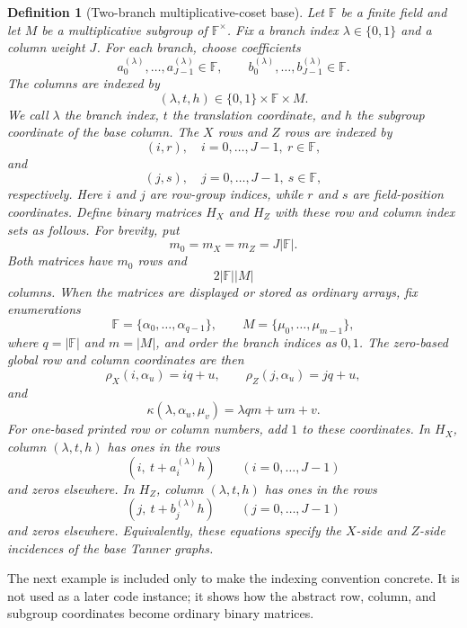 \documentclass[11pt,a4paper]{article}
\newcommand{\F}{\mathbb{F}}
\newcommand{\HX}{H_X}
\newcommand{\HZ}{H_Z}
\theoremstyle{uprighttheorem}
\newtheorem{definition}{Definition}
\begin{document}
\begin{definition}[Two-branch multiplicative-coset base]\label{def:two-branch-coset-base}
Let $\F$ be a finite field and let $M$ be a multiplicative subgroup of $\F^\times$.
Fix a branch index $\lambda\in\{0,1\}$ and a column weight $J$.
For each branch, choose coefficients
\[
  a_0^{(\lambda)},\ldots,a_{J-1}^{(\lambda)}\in\F,\qquad
  b_0^{(\lambda)},\ldots,b_{J-1}^{(\lambda)}\in\F.
\]
The columns are indexed by
\[
  (\lambda,t,h)\in\{0,1\}\times\F\times M.
\]
We call $\lambda$ the branch index, $t$ the translation coordinate, and $h$ the subgroup coordinate of the base column.
The $X$ rows and $Z$ rows are indexed by
\[
  (i,r),\quad i=0,\ldots,J-1,\ r\in\F,
\]
and
\[
  (j,s),\quad j=0,\ldots,J-1,\ s\in\F,
\]
respectively.
Here $i$ and $j$ are row-group indices, while $r$ and $s$ are field-position coordinates.
Define binary matrices $\HX$ and $\HZ$ with these row and column index sets as follows.
For brevity, put
\[
  m_0=m_X=m_Z=J|\F|.
\]
Both matrices have $m_0$ rows and
\[
  2|\F||M|
\]
columns.
When the matrices are displayed or stored as ordinary arrays, fix enumerations
\[
  \F=\{\alpha_0,\ldots,\alpha_{q-1}\},\qquad
  M=\{\mu_0,\ldots,\mu_{m-1}\},
\]
where \(q=|\F|\) and \(m=|M|\), and order the branch indices as
\(0,1\).
The zero-based global row and column coordinates are then
\begin{equation}
\label{eq:global-row-coordinate}
  \rho_X(i,\alpha_u)=iq+u,\qquad
  \rho_Z(j,\alpha_u)=jq+u,
\end{equation}
and
\begin{equation}
\label{eq:global-column-coordinate}
  \kappa(\lambda,\alpha_u,\mu_v)
  =\lambda qm+um+v.
\end{equation}
For one-based printed row or column numbers, add \(1\) to these coordinates.
In $\HX$, column $(\lambda,t,h)$ has ones in the rows
\begin{equation}
\label{eq:hx-incidence}
  (i,\ t+a_i^{(\lambda)}h)\qquad (i=0,\ldots,J-1)
\end{equation}
and zeros elsewhere.
In $\HZ$, column $(\lambda,t,h)$ has ones in the rows
\begin{equation}
\label{eq:hz-incidence}
  (j,\ t+b_j^{(\lambda)}h)\qquad (j=0,\ldots,J-1)
\end{equation}
and zeros elsewhere.
Equivalently, these equations specify the $X$-side and $Z$-side incidences of the base Tanner graphs.
\end{definition}

The next example is included only to make the indexing convention concrete.
It is not used as a later code instance; it shows how the abstract row, column, and subgroup coordinates become ordinary binary matrices.
\end{document}
